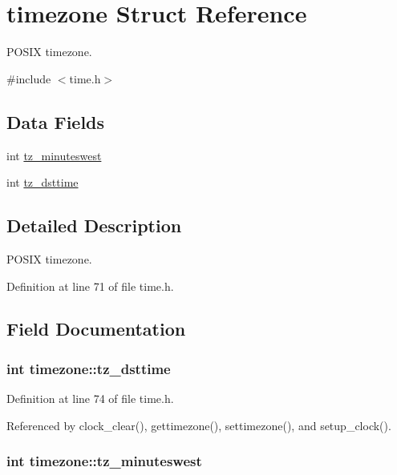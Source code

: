 \hypertarget{structtimezone}{\section{timezone Struct Reference}
\label{structtimezone}
}


P\-O\-S\-I\-X timezone.  




{\ttfamily \#include $<$time.\-h$>$}

\subsection*{Data Fields}
\begin{DoxyCompactItemize}
\item 
int \hyperlink{structtimezone_a3042f7eff6e1b980728def76b1fa0eb7}{tz\-\_\-minuteswest}
\item 
int \hyperlink{structtimezone_a85259977aeb63b17e6ce94f19afdfd99}{tz\-\_\-dsttime}
\end{DoxyCompactItemize}


\subsection{Detailed Description}
P\-O\-S\-I\-X timezone. 

Definition at line 71 of file time.\-h.



\subsection{Field Documentation}
\hypertarget{structtimezone_a85259977aeb63b17e6ce94f19afdfd99}{
\subsubsection[{tz\-\_\-dsttime}]{\setlength{\rightskip}{0pt plus 5cm}int timezone\-::tz\-\_\-dsttime}}\label{structtimezone_a85259977aeb63b17e6ce94f19afdfd99}


Definition at line 74 of file time.\-h.



Referenced by clock\-\_\-clear(), gettimezone(), settimezone(), and setup\-\_\-clock().

\hypertarget{structtimezone_a3042f7eff6e1b980728def76b1fa0eb7}{
\subsubsection[{tz\-\_\-minuteswest}]{\setlength{\rightskip}{0pt plus 5cm}int timezone\-::tz\-\_\-minuteswest}}\label{structtimezone_a3042f7eff6e1b980728def76b1fa0eb7}


